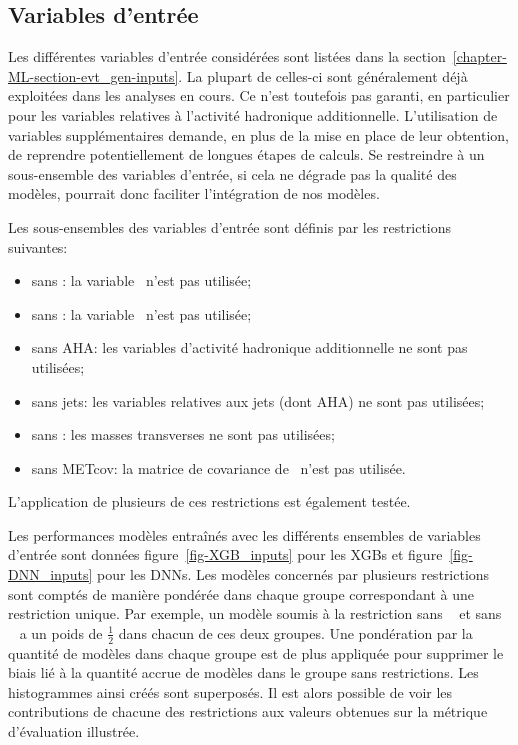 \subsection{Variables d'entrée}\label{chapter-ML-section-hyperparameters-inputs}
Les différentes variables d'entrée considérées sont listées dans la section~\ref{chapter-ML-section-evt_gen-inputs}.
La plupart de celles-ci sont généralement déjà exploitées dans les analyses en cours.
Ce n'est toutefois pas garanti, en particulier pour les variables relatives à l'activité hadronique additionnelle.
L'utilisation de variables supplémentaires demande,
en plus de la mise en place de leur obtention,
de reprendre potentiellement de longues étapes de calculs.
Se restreindre à un sous-ensemble des variables d'entrée,
si cela ne dégrade pas la qualité des modèles,
pourrait donc faciliter l'intégration de nos modèles.
\par
Les sous-ensembles des variables d'entrée sont définis par les restrictions suivantes:
\begin{itemize}
\item sans \Npu: la variable \Npu\ n'est pas utilisée;
\item sans \Nnu: la variable \Nnu\ n'est pas utilisée;
\item sans AHA: les variables d'activité hadronique additionnelle ne sont pas utilisées;
\item sans jets: les variables relatives aux jets (dont AHA) ne sont pas utilisées;
\item sans \mT: les masses transverses ne sont pas utilisées;
\item sans METcov: la matrice de covariance de \MET\ n'est pas utilisée.
\end{itemize}
L'application de plusieurs de ces restrictions est également testée.
\par
Les performances modèles entraînés avec les différents ensembles de variables d'entrée sont données
figure~\ref{fig-XGB_inputs} pour les XGBs
et
figure~\ref{fig-DNN_inputs}
pour les DNNs.
Les modèles concernés par plusieurs restrictions sont comptés de manière pondérée dans chaque groupe correspondant à une restriction unique.
Par exemple, un modèle soumis à la restriction \og sans \Npu\ \fg{} et \og sans \Nnu\ \fg{} a un poids de $\frac{1}{2}$ dans chacun de ces deux groupes.
Une pondération par la quantité de modèles dans chaque groupe est de plus appliquée pour supprimer le biais lié à la quantité accrue de modèles dans le groupe sans restrictions.
Les histogrammes ainsi créés sont superposés.
Il est alors possible de voir les contributions de chacune des restrictions aux valeurs obtenues sur la métrique d'évaluation illustrée.
